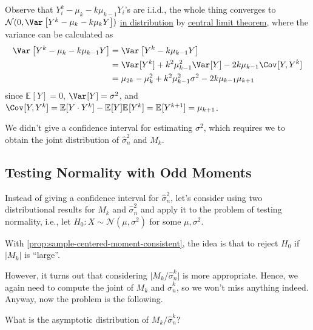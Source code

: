 Observe that \(Y_i^k - \mu _k - k \mu _{k-1} Y_i\)'s are i.i.d., the whole thing converges to \(\mathcal{N} (0, \Var_{}\left[Y^k - \mu _k - k \mu _k Y\right] )\) \hyperref[def:converge-in-distribution]{in distribution} by \hyperref[thm:CLT]{central limit theorem}, where the variance can be calculated as
\[
	\begin{split}
		\Var_{}\left[Y^k - \mu _k - k \mu _{k-1} Y\right]
		 & = \Var_{}\left[Y^k - k \mu _{k-1} Y\right]                                      \\
		 & = \Var_{}[Y^k] + k^2 \mu _{k-1}^2 \Var_{}[Y] - 2 k \mu _{k-1} \Cov_{}[Y, Y^k]   \\
		 & = \mu _{2k} - \mu _k^2 + k^2 \mu _{k-1}^2 \sigma ^2 - 2 k \mu _{k-1} \mu _{k+1}
	\end{split}
\]
since \(\mathbb{E}_{}[Y] = 0\), \(\Var_{}[Y] = \sigma ^2\), and \(\Cov_{}[Y, Y^k] = \mathbb{E}_{}[Y \cdot Y^k] - \mathbb{E}_{}[Y] \mathbb{E}_{}[Y^k] = \mathbb{E}_{}[Y^{k+1}] = \mu _{k+1}\).

\begin{remark}
	We didn't give a confidence interval for estimating \(\sigma ^2\), which requires we to obtain the joint distribution of \(\hat{\sigma} _n^2\) and \(M_k\).
\end{remark}

\subsection{Testing Normality with Odd Moments}
Instead of giving a confidence interval for \(\hat{\sigma} _n^2\), let's consider using two distributional results for \(M_k\) and \(\hat{\sigma} _n^2\) and apply it to the problem of testing normality, i.e., let \(H_0 \colon X \sim \mathcal{N} (\mu , \sigma ^2)\) for some \(\mu , \sigma ^2\).

\begin{intuition}
	With \autoref{prop:sample-centered-moment-consistent}, the idea is that to reject \(H_0\) if \(\vert M_k \vert \) is ``large''.
\end{intuition}

However, it turns out that considering \(\vert M_k / \hat{\sigma} _n^k \vert \) is more appropriate. Hence, we again need to compute the joint of \(M_k\) and \(\hat{\sigma} _n^k\), so we won't miss anything indeed. Anyway, now the problem is the following.

\begin{problem*}
	What is the asymptotic distribution of \( M_k / \hat{\sigma} _n^k \)?
\end{problem*}

